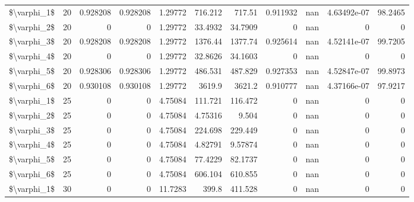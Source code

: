 \begin{tabular}{lrrrrrrrrrr}
 \$\textbackslash{}varphi\_1\$ &  20 & 0.928208 & 0.928208 &   1.29772   &   716.212   &    717.51    &     0.911932 &         nan &  4.63492e-07 &      98.2465 \\
 \$\textbackslash{}varphi\_2\$ &  20 & 0        & 0        &   1.29772   &    33.4932  &     34.7909  &     0        &         nan &  0           &       0      \\
 \$\textbackslash{}varphi\_3\$ &  20 & 0.928208 & 0.928208 &   1.29772   &  1376.44    &   1377.74    &     0.925614 &         nan &  4.52141e-07 &      99.7205 \\
 \$\textbackslash{}varphi\_4\$ &  20 & 0        & 0        &   1.29772   &    32.8626  &     34.1603  &     0        &         nan &  0           &       0      \\
 \$\textbackslash{}varphi\_5\$ &  20 & 0.928306 & 0.928306 &   1.29772   &   486.531   &    487.829   &     0.927353 &         nan &  4.52847e-07 &      99.8973 \\
 \$\textbackslash{}varphi\_6\$ &  20 & 0.930108 & 0.930108 &   1.29772   &  3619.9     &   3621.2     &     0.910777 &         nan &  4.37166e-07 &      97.9217 \\
 \$\textbackslash{}varphi\_1\$ &  25 & 0        & 0        &   4.75084   &   111.721   &    116.472   &     0        &         nan &  0           &       0      \\
 \$\textbackslash{}varphi\_2\$ &  25 & 0        & 0        &   4.75084   &     4.75316 &      9.504   &     0        &         nan &  0           &       0      \\
 \$\textbackslash{}varphi\_3\$ &  25 & 0        & 0        &   4.75084   &   224.698   &    229.449   &     0        &         nan &  0           &       0      \\
 \$\textbackslash{}varphi\_4\$ &  25 & 0        & 0        &   4.75084   &     4.82791 &      9.57874 &     0        &         nan &  0           &       0      \\
 \$\textbackslash{}varphi\_5\$ &  25 & 0        & 0        &   4.75084   &    77.4229  &     82.1737  &     0        &         nan &  0           &       0      \\
 \$\textbackslash{}varphi\_6\$ &  25 & 0        & 0        &   4.75084   &   606.104   &    610.855   &     0        &         nan &  0           &       0      \\
 \$\textbackslash{}varphi\_1\$ &  30 & 0        & 0        &  11.7283    &   399.8     &    411.528   &     0        &         nan &  0           &       0      \\

\end{tabular}
